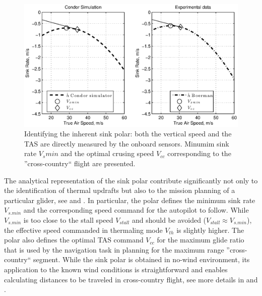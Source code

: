 \documentclass{ifacconf}
\begin{document}
\begin{figure}[thpb]
  \centering
  \includegraphics[scale=0.49]{Figures/Condor_Boermans_comparison.eps}
  \caption{Identifying the inherent sink polar: both the vertical speed and the TAS are directly measured by the onboard sensors. Minumim sink rate $V_s min$ and the optimal crusing speed $V_{cc}$ corresponding to the ''cross-country`` flight are presented.}
  \label{fig:SinkPolar}
\end{figure}

The analytical representation of the sink polar contribute significantly not only to the identification of thermal updrafts but also to the mission planning of a particular glider, see \cite{Piggott:1997} and \cite{FAA:2011}. In particular, the polar defines the minimum sink rate $V_{s.min}$ and the corresponding speed command for the autopilot to follow. While $V_{s.min}$ is too close to the stall speed $V_{stall}$ and should be avoided ($V_{stall} \approx V_{s.min}$), the effective speed commanded in thermaling mode $V_{th}$ is slightly higher. The polar also defines the optimal TAS command  $V_{cc}$ for the maximum glide ratio that is used by the navigation task in planning for the maximum range ''cross-country`` segment. While the sink polar is obtained in no-wind environment, its application to the known wind conditions is straightforward and enables calculating distances to be traveled in cross-country flight, see more details in \cite{Piggott:1997} and \cite{FAA:2011}.
\end{document}
